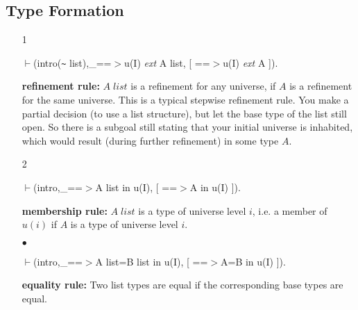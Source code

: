 \documentclass[11pt]{report}
\begin{document}
 \subsection{Type Formation}
  
 \begin{enumerate}
 \item[1]
\begin{sf}\begin{tabbing}
$\vdash$(intro({\verb`~`} list),\_\hspace{0.1em}==$>$u(I) \mbox{\it ext} A list, [ ==$>$u(I) \mbox{\it ext} A ]).
\end{tabbing}\end{sf}

 {\bf refinement rule:} $A\;list$ is a refinement
 for any universe, if $A$ is a refinement for the same universe. 
 This is a typical stepwise refinement rule. 
 You make a partial decision (to use a list structure),
 but let the base type of the list still open. So there is a subgoal
 still stating that your initial universe is inhabited, which would
 result (during further refinement) in some type $A$.
 \item[2]
\begin{sf}\begin{tabbing}
$\vdash$(intro,\_\hspace{0.1em}==$>$A list in u(I), [ ==$>$A in u(I) ]).
\end{tabbing}\end{sf}

 {\bf membership rule:} $A\;list$ is a type of universe level $i$,
 i.e. a member of $u(i)$ if $A$ is a type of universe level $i$.
  
 \item[$\bullet$]
\begin{sf}\begin{tabbing}
$\vdash$(intro,\_\hspace{0.1em}==$>$A list=B list in u(I), [ ==$>$A=B in u(I) ]).
\end{tabbing}\end{sf}

 {\bf equality rule:}
 Two list types are equal if the corresponding base types are
 equal.
 \end{enumerate}
  
\end{document}
